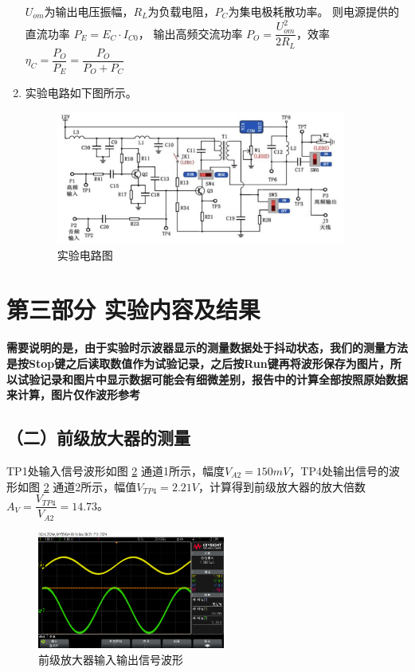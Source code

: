 \documentclass[UTF8]{ctexart}
\begin{document}
\begin{enumerate}
    $U_{om}$为输出电压振幅，$R_L$为负载电阻，$P_C$为集电极耗散功率。
    则电源提供的直流功率
    $P_E=E_C\cdot I_{C0}$，
    输出高频交流功率
    $P_O=\dfrac{U_{om}^2}{2R_L}$，效率
    $\eta_C=\dfrac{P_O}{P_E}=\dfrac{P_O}{P_O+P_C}$

    \item 实验电路如下图所示。

    \begin{figure}[H]
        \centering
        \includegraphics[width=0.9\textwidth]{pics/circuit.png}

        \caption{实验电路图}\label{fig:2.2}
    \end{figure}
\end{enumerate}


\section{第三部分 \texorpdfstring{\quad}{} 实验内容及结果}
\textbf{需要说明的是，由于实验时示波器显示的测量数据处于抖动状态，我们的测量方法是按Stop键之后读取数值作为试验记录，之后按Run键再将波形保存为图片，所以试验记录和图片中显示数据可能会有细微差别，报告中的计算全部按照原始数据来计算，图片仅作波形参考}
\subsection*{（二）前级放大器的测量}
TP1处输入信号波形如图 \ref{fig:3.1} 通道1所示，幅度$V_{A2}=150mV$，TP4处输出信号的波形如图 \ref{fig:3.1} 通道2所示，幅值$V_{TP4}=2.21V$，计算得到前级放大器的放大倍数$A_V=\dfrac{V_{TP4}}{V_{A2}}=14.73$。
\begin{figure}[H]
    \centering
    \includegraphics[width=0.55\textwidth]{pics/31.png}

    \caption{前级放大器输入输出信号波形}\label{fig:3.1}
\end{figure}
\vspace{-2em}
\end{document}
